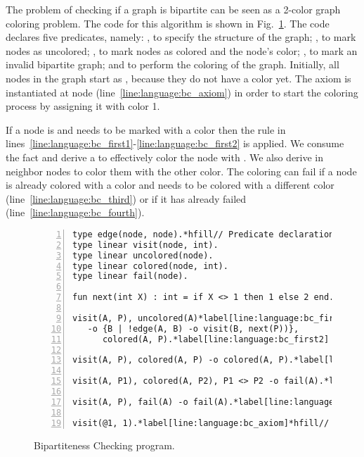 The problem of checking if a graph is bipartite can be seen as a 2-color graph
coloring problem. The code for this algorithm is shown in
Fig.~\ref{language:code:bichecking}. The code declares five predicates, namely:
, to specify the structure of the graph; , to mark
nodes as uncolored; , to mark nodes as colored and the node's
color; , to mark an invalid bipartite graph; and  to
perform the coloring of the graph.  Initially, all nodes in the graph start as
, because they do not have a color yet. The axiom
 is instantiated at node 
(line~\ref{line:language:bc_axiom}) in order to start the coloring process by
assigning it with color 1.

If a node is  and needs to be marked with a color  then
the rule in lines~\ref{line:language:bc_first1}-\ref{line:language:bc_first2} is
applied. We consume the  fact and derive a 
to effectively color the node with . We also derive  in neighbor nodes to color them with the other color.  The coloring
can fail if a node is already colored with a color  and needs to be
colored with a different color (line~\ref{line:language:bc_third}) or if it has
already failed (line~\ref{line:language:bc_fourth}).

\begin{figure}[h!]
\begin{Verbatim}[numbers=left,fontsize=\codesize,commandchars=\*\[\]]
type edge(node, node).*hfill// Predicate declaration
type linear visit(node, int).
type linear uncolored(node).
type linear colored(node, int).
type linear fail(node).

fun next(int X) : int = if X <> 1 then 1 else 2 end.*hfill// Function declaration

visit(A, P), uncolored(A)*label[line:language:bc_first1]*hfill// Rule 1: coloring a node
   -o {B | !edge(A, B) -o visit(B, next(P))},
      colored(A, P).*label[line:language:bc_first2]

visit(A, P), colored(A, P) -o colored(A, P).*label[line:language:bc_second]*hfill// Rule 2: node is already colored

visit(A, P1), colored(A, P2), P1 <> P2 -o fail(A).*label[line:language:bc_third]*hfill// Rule 3: graph is not bipartite

visit(A, P), fail(A) -o fail(A).*label[line:language:bc_fourth]*hfill// Rule 4: graph is still not bipartite

visit(@1, 1).*label[line:language:bc_axiom]*hfill// Initial facts
\end{Verbatim}
  \caption{Bipartiteness Checking program.}
  \label{language:code:bichecking}
\end{figure}

